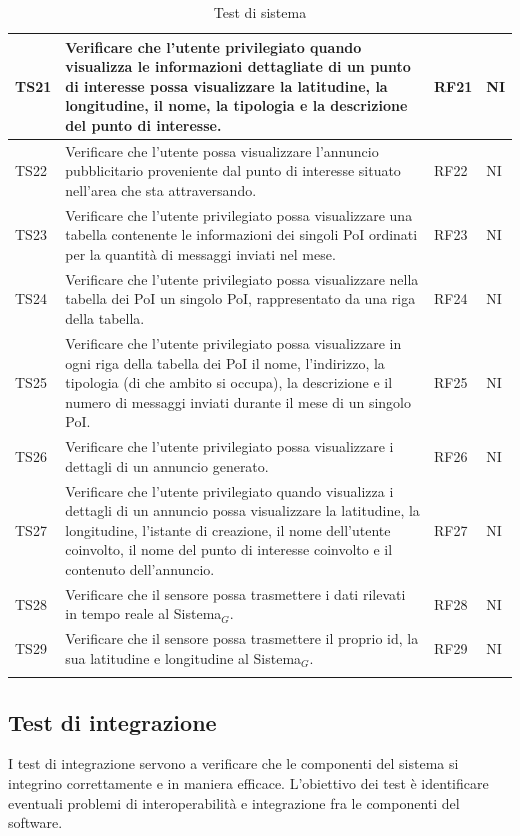 \documentclass[10pt]{article}
\begin{document}
\begin{justify}
\begin{longtable}{|>{\centering\arraybackslash}m{2cm}|>{\centering\arraybackslash}m{7cm}|>{\centering\arraybackslash}m{2cm}|>{\centering\arraybackslash}m{2cm}|}
\hline
TS21 & Verificare che l'utente privilegiato quando visualizza le informazioni dettagliate di un punto di interesse possa visualizzare la latitudine, la longitudine, il nome, la tipologia e la descrizione del punto di interesse. & RF21 & NI \\
\hline
TS22 & Verificare che l'utente possa visualizzare l'annuncio pubblicitario proveniente dal punto di interesse situato nell'area che sta attraversando. & RF22 & NI \\
\hline
TS23 & Verificare che l'utente privilegiato possa visualizzare una tabella contenente le informazioni dei singoli PoI ordinati per la quantità di messaggi inviati nel mese. & RF23 & NI \\
\hline
TS24 & Verificare che l'utente privilegiato possa visualizzare nella tabella dei PoI un singolo PoI, rappresentato da una riga della tabella. & RF24 & NI \\
\hline
TS25 & Verificare che l'utente privilegiato possa visualizzare in ogni riga della tabella dei PoI il nome, l'indirizzo, la tipologia (di che ambito si occupa), la descrizione e il numero di messaggi inviati durante il mese di un singolo PoI. & RF25 & NI \\
\hline
TS26 & Verificare che l'utente privilegiato possa visualizzare i dettagli di un annuncio generato. & RF26 & NI \\
\hline
TS27 & Verificare che l'utente privilegiato quando visualizza i dettagli di un annuncio possa visualizzare la latitudine, la longitudine, l'istante di creazione, il nome dell'utente coinvolto, il nome del punto di interesse coinvolto e il contenuto dell'annuncio. & RF27 & NI \\
\hline
TS28 & Verificare che il sensore possa trasmettere i dati rilevati in tempo reale al Sistema$_G$. & RF28 & NI\\
\hline
TS29 & Verificare che il sensore possa trasmettere il proprio id, la sua latitudine e longitudine al Sistema$_G$. & RF29 & NI\\
\hline
\caption{Test di sistema}\\
\end{longtable}

\subsection{Test di integrazione}
I test di integrazione servono a verificare che le componenti del sistema si integrino correttamente e in maniera efficace. L'obiettivo dei test
è identificare eventuali problemi di interoperabilità e integrazione fra le componenti del software.\\


\end{justify}
\end{document}
